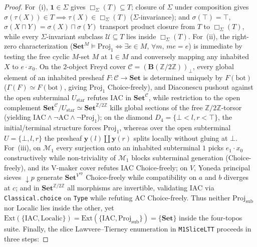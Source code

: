 \documentclass[10pt,twoside,openright]{book}
\theoremstyle{crmplain}
\theoremstyle{crmdef}
\theoremstyle{crmremark}
\begin{document}
\begin{proof}
For~(i), $\mathbf{1} \in \Sigma$ gives $\Box_\Sigma(T) \subseteq T$; closure of $\Sigma$ under composition gives $\sigma(\tau(X)) \in T \implies \tau(X) \in \Box_\Sigma(T)$ ($\Sigma$-invariance); and $\sigma(\top) = \top$, $\sigma(X \sqcap Y) = \sigma(X) \sqcap \sigma(Y)$ transport product closure from $T$ to $\Box_\Sigma(T)$, while every $\Sigma$-invariant subclass $\mathcal{U} \subseteq T$ lies inside $\Box_\Sigma(T)$. For~(ii), the right-zero characterization ($\mathbf{Set}^M \models \mathrm{Proj}_1 \iff \exists e \in M,\, \forall m,\, me = e$) is immediate by testing the free cyclic $M$-set $M$ at $1 \in M$ and conversely mapping any inhabited $X$ to $e \cdot x_0$. On the $2$-object Freyd cover $\mathcal{C} = (\mathbf{B}(\mathbb{Z}/2\mathbb{Z}))_\bot$, every global element of an inhabited presheaf $F : \mathcal{C} \to \mathbf{Set}$ is determined uniquely by $F(\mathrm{bot})$ ($\Gamma(F) \simeq F(\mathrm{bot})$, giving $\mathrm{Proj}_1$ Choice-freely), and Diaconescu pushout against the open subterminal $U_{\mathrm{star}}$ refutes $\mathrm{IAC}$ in $\mathbf{Set}^{\mathcal{C}}$, while restriction to the open complement $\mathbf{Set}^{\mathcal{C}}/U_{\mathrm{star}} \simeq \mathbf{Set}^{\mathbb{Z}/2\mathbb{Z}}$ kills global sections of the free $\mathbb{Z}/2\mathbb{Z}$-torsor (yielding $\mathrm{IAC} \wedge \neg\mathrm{AC} \wedge \neg\mathrm{Proj}_1$); on the diamond $D_4 = \{\bot < l, r < \top\}$, the initial/terminal structure forces $\mathrm{Proj}_1$, whereas over the open subterminal $U = \{\bot, l, r\}$ the presheaf $\mathbf{y}(l) \amalg \mathbf{y}(r)$ splits locally without gluing at $\bot$. For~(iii), on $\mathcal{M}_1$ every surjection onto an inhabited subterminal $1$ picks $e_1 \cdot x_0$ constructively while non-triviality of $\mathcal{M}_1$ blocks subterminal generation (Choice-freely), and its V-maker cover refutes $\mathrm{IAC}$ Choice-freely; on $V$, Yoneda principal sieves $\downarrow p$ generate $\mathbf{Set}^{V^{\mathrm{op}}}$ Choice-freely while compatibility on $a$ and $b$ diverges at $c$; and in $\mathbf{Set}^{\mathbb{Z}/2\mathbb{Z}}$ all morphisms are invertible, validating $\mathrm{IAC}$ via \texttt{Classical.choice} on \texttt{Type} while refuting $\mathrm{AC}$ Choice-freely. Thus neither $\mathrm{Proj}_{\mathrm{sub}}$ nor $\mathrm{Localic}$ lies inside the other, yet $\mathrm{Ext}(\{\mathrm{IAC}, \mathrm{Localic}\}) = \mathrm{Ext}(\{\mathrm{IAC}, \mathrm{Proj}_{\mathrm{sub}}\}) = \{\mathbf{Set}\}$ inside the four-topos suite. Finally, the slice Lawvere--Tierney enumeration in \texttt{M1SliceLTT} proceeds in three steps:

\end{proof}
\end{document}
